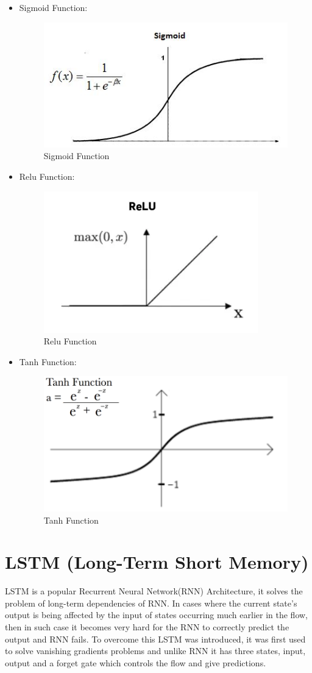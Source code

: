 \documentclass[oneside,12pt]{Classes/RoboticsLaTeX}
\begin{document}
\begin{itemize}
  \item Sigmoid Function:
  \begin{figure}[H]
    \centering
    \includegraphics[width=0.5\linewidth]{Figures/sigmoid.png}
    \caption{Sigmoid Function}
    \label{fig:sigmoid}
  \end{figure}

  \item Relu Function:
  \begin{figure}[H]
    \centering
    \includegraphics[width=0.5\linewidth]{Figures/relu.png}
    \caption{Relu Function}
    \label{fig:relu}
  \end{figure}

  \item Tanh Function:
  \begin{figure}[H]
    \centering
    \includegraphics[width=0.5\linewidth]{Figures/tanh.png}
    \caption{Tanh Function}
    \label{fig:tanh}
  \end{figure}
\end{itemize}

\section{LSTM (Long-Term Short Memory)}
LSTM is a popular Recurrent Neural Network(RNN) Architecture, it solves the problem of long-term dependencies of RNN. In cases where the current state's output is being affected by the input of states occurring much earlier in the flow, then in such case it becomes very hard for the RNN to correctly predict the output and RNN fails. To overcome this LSTM was introduced, it was first used to solve vanishing gradients problems and unlike RNN it has three states, input, output and a forget gate which controls the flow and give predictions.
\end{document}
